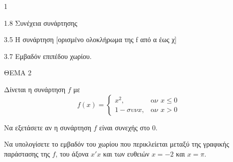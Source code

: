 \begin{ylh}{1}
    \item 1.8 Συνέχεια συνάρτησης
    \item 3.5 Η συνάρτηση [ορισμένο ολοκλήρωμα της f από α έως χ]
    \item 3.7 Εμβαδόν επιπέδου χωρίου.
\end{ylh}
ΘΕΜΑ 2

Δίνεται η συνάρτηση $f$ με
\[ f(x) = \begin{cases}
x^2, & \text{αν } x \le 0 \\
1 - \sigma\upsilon\nu x, & \text{αν } x > 0
\end{cases} \]
\begin{alist}
\item Να εξετάσετε αν η συνάρτηση $f$ είναι συνεχής στο $0$. 
\item Να υπολογίσετε το εμβαδόν του χωρίου που περικλείεται μεταξύ της γραφικής παράστασης της $f$, του άξονα $x'x$ και των ευθειών $x = -2$ και $x = \pi$. 
\end{alist}